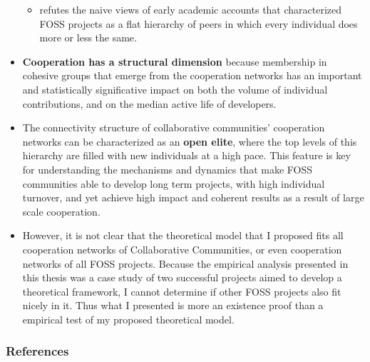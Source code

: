 \documentclass[ignorenonframetext,red,8pt,notes=show]{beamer}
\begin{document}
\begin{frame}
\begin{itemize}
\begin{itemize}
\item refutes the naive views of early academic accounts that characterized FOSS projects as a flat hierarchy of peers in which every individual does more or less the same.
\end{itemize}

\item \textbf{Cooperation has a structural dimension} because membership in cohesive groups that emerge from the cooperation networks has an important and statistically significative impact on both the volume of individual contributions, and on the median active life of developers.

\item The connectivity structure of collaborative communities' cooperation networks can be characterized as an \textbf{open elite}, where the top levels of this hierarchy are filled with new individuals at a high pace. This feature is key for understanding the mechanisms and dynamics that make FOSS communities able to develop long term projects, with high individual turnover, and yet achieve high impact and coherent results as a result of large scale cooperation.

\item However, it is not clear that the theoretical model that I proposed fits all cooperation networks of Collaborative Communities, or even cooperation networks of all FOSS projects. Because the empirical analysis presented in this thesis was a case study of two successful projects aimed to develop a theoretical framework, I cannot determine if other FOSS projects also fit nicely in it. Thus what I presented is more an existence proof than a empirical test of my proposed theoretical model.

\end{itemize}


\end{frame}


\begin{frame}[label=biblio]
\frametitle{References}
\begin{tiny}


\end{tiny}
\end{frame}
\end{document}
